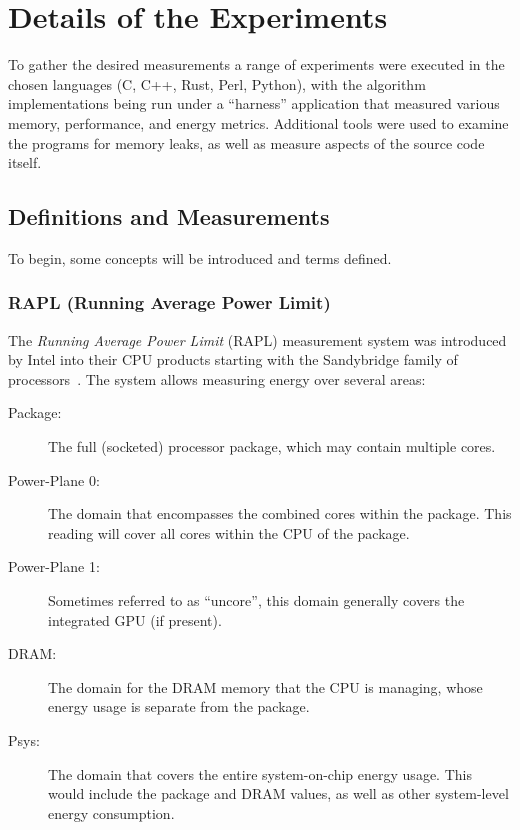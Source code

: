 \section{Details of the Experiments}
\label{sec:experiments}

To gather the desired measurements a range of experiments were executed in the chosen languages (C, C++, Rust, Perl, Python), with the algorithm implementations being run under a ``harness'' application that measured various memory, performance, and energy metrics. Additional tools were used to examine the programs for memory leaks, as well as measure aspects of the source code itself.

\subsection{Definitions and Measurements}

To begin, some concepts will be introduced and terms defined.

\subsubsection{RAPL (Running Average Power Limit)}
\label{subsubsec:rapl}

The \textit{Running Average Power Limit} (RAPL) measurement system was introduced by Intel into their CPU products starting with the Sandybridge family of processors~\cite{khan.et.al.2018}. The system allows measuring energy over several areas:

\begin{description}
\item[Package:] The full (socketed) processor package, which may contain multiple cores.
\item[Power-Plane 0:] The domain that encompasses the combined cores within the package. This reading will cover all cores within the CPU of the package.
\item[Power-Plane 1:] Sometimes referred to as ``uncore'', this domain generally covers the integrated GPU (if present).
\item[DRAM:] The domain for the DRAM memory that the CPU is managing, whose energy usage is separate from the package.
\item[Psys:] The domain that covers the entire system-on-chip energy usage. This would include the package and DRAM values, as well as other system-level energy consumption.
\end{description}

